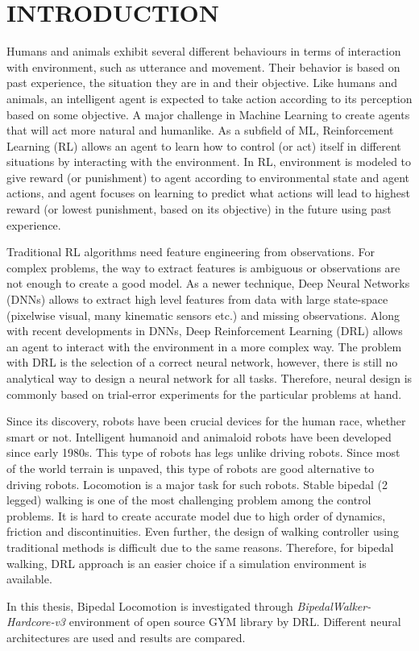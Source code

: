 \chapter{INTRODUCTION}
\label{chap:intro}


Humans and animals exhibit several different behaviours in terms of 
interaction with environment, such as utterance and movement. 
Their behavior is based on past experience, the situation they are in  and their objective. 
Like humans and animals, an intelligent agent is expected to take 
action according to its perception based on some objective. 
A major challenge in Machine Learning to create agents that will 
act more natural and humanlike. 
As a subfield of ML, Reinforcement Learning (RL) allows an 
agent to learn how to control (or act) itself in different situations by interacting with the environment. 
In RL, environment is modeled to give reward (or punishment) to agent 
according to environmental state and agent actions, and agent focuses
on learning to predict what actions will lead to highest reward 
(or lowest punishment, based on its objective) in the future using past experience. 

Traditional RL algorithms need feature engineering from observations. 
For complex problems, the way to extract features is ambiguous or 
observations are not enough to create a good model. 
As a newer  technique, Deep Neural Networks (DNNs) allows to extract 
high level features from data with large state-space 
(pixelwise visual, many kinematic sensors etc.) and missing  observations. 
Along with recent developments in DNNs, Deep Reinforcement Learning (DRL)
allows an agent to interact with the environment in a more complex way. 
The problem with DRL is the selection of a correct neural network, 
however, there is still no analytical way to design a neural network for all tasks. 
Therefore, neural design is commonly based on trial-error experiments for the particular problems at hand.

Since its discovery, robots have been crucial devices for the human race, whether smart or not. 
Intelligent humanoid and animaloid robots have been developed since early 1980s. 
This type of robots has legs unlike driving robots. 
Since most of the world terrain is unpaved, this type of robots are good alternative to driving robots. 
Locomotion is a major task for such robots. Stable bipedal (2 legged)  walking 
is one of the most challenging problem among the control problems. 
It is hard to create accurate model due to high order of dynamics,  friction and discontinuities. 
Even further, the design of walking controller using traditional methods is difficult due to the same reasons. 
Therefore, for bipedal walking, DRL approach is an easier choice if a simulation environment is available. 

In this thesis, Bipedal Locomotion is investigated through \textit{BipedalWalker-Hardcore-v3} \cite{noauthor_bipedalwalkerhardcore-v2_2021} environment of open source GYM library \cite{brockman_openai_2016} by DRL. Different neural architectures are used and results are compared. 
